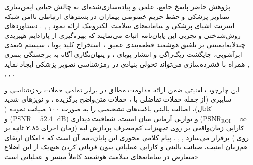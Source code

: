 






پژوهش حاضر پاسخ جامع، علمی و پیاده‌سازی‌شده‌ای به چالش حیاتی ایمن‌سازی تصاویر پزشکی و حفظ حریم خصوصی بیماران در بسترهای ارتباطی ناامن شبکه اینترنت اشیای پزشکی  و سامانه‌های سلامت الکترونیک  ارائه نمود , , . دستاوردهای روش‌شناختی و تجربی این پایان‌نامه اثبات می‌نمایند که بهره‌گیری از پارادایم هیبریدی چندلایه‌ایمبتنی بر تلفیق هوشمند قطعه‌بندی عمیق ، استخراج کلید پویا ، سیستم ۵بعدی ابرآشوبی، جایگشت زیگ‌زاگی و انتشار پویای ، و پنهان‌نگاری آگاه به برجستگی بصری  همراه با فشرده‌سازی می‌تواند تحولی بنیادی در رمزشناسی تصویر پزشکی ایجاد نماید , , , .\par



این چارچوب امنیتی ضمن ارائه مقاومت مطلق در برابر تمامی حملات رمزشناسی و سایبری (از جمله حملات تفاضلی با ، حملات متن‌واضح برگزیده ، و نویزهای شدید کانال)، اصالت بالینی بافت‌های تشخیصی را به صورت ۱۰۰ صیانت نموده ($\mathrm{PSNR}_{\mathrm{ROI}} = \infty$) و توازنی آرمانی میان امنیت، شفافیت دیداری ($\mathrm{PSNR} = 52.41\mathrm{\ dB}$) و کارایی زمان‌واقعی بر روی تجهیزات کم‌مصرف پردازش لبه (زمان اجرای ۲.۸۵ ثانیه بر روی ) برقرار می‌سازد , , . پیام کلامی محوری این پایان‌نامه آن است که «امکان ارتقای هم‌زمان امنیت، صیانت بالینی و کارایی عملیاتی بدون قربانی کردن هیچ‌یک از این اضلاع متعارض در سامانه‌های سلامت هوشمند کاملاً میسر و عملیاتی است».\par

